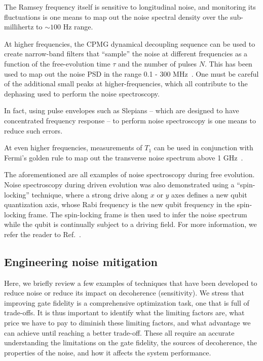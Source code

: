 \documentclass[aip,apr,twocolumn,showpacs,superscriptaddress,groupedaddress,nofootinbib,reprint]{revtex4-1}  %
\begin{document}
The Ramsey frequency itself is sensitive to longitudinal noise, and monitoring its fluctuations is one means to map out the noise spectral density over the sub-millihertz to $\sim100$ Hz range\cite{Yan2012,SankPhD2014}.

At higher frequencies, the CPMG dynamical decoupling sequence can be used to create narrow-band filters that ``sample'' the noise at different frequencies as a function of the free-evolution time $\tau$ and the number of pulses $N$. This has been used to map out the noise PSD in the range 0.1 - 300 MHz~\cite{Bylander2011}.
One must be careful of the additional small peaks at higher-frequencies, which all contribute to the dephasing used to perform the noise spectroscopy\cite{Loretz2015}.

In fact, using pulse envelopes such as Slepians\cite{Slepian1961} -- which are designed to have concentrated frequency response -- to perform noise spectroscopy is one means to reduce such errors\cite{Biercuk2009a}.

At even higher frequencies, measurements of $T_1$ can be used in conjunction with Fermi's golden rule to map out the transverse noise spectrum above 1 GHz~\cite{Bylander2011,Yan2016,Schoelkopf2002}.

The aforementioned are all examples of noise spectroscopy during free evolution. Noise spectroscopy during driven evolution was also demonstrated using a ``spin-locking'' technique, where a strong drive along $x$ or $y$ axes defines a new qubit quantization axis, whose Rabi frequency is the new qubit frequency in the spin-locking frame. The spin-locking frame is then used to infer the noise spectrum while the qubit is continually subject to a driving field. For more information, we refer the reader to Ref.~.

\subsection{Engineering noise mitigation}

Here, we briefly review a few examples of techniques that have been developed to reduce noise or reduce its impact on decoherence (sensitivity). We stress that improving gate fidelity is a comprehensive optimization task, one that is full of trade-offs. It is thus important to identify what the limiting factors are, what price we have to pay to diminish these limiting factors, and what advantage we can achieve until reaching a better trade-off. These all require an accurate understanding the limitations on the gate fidelity, the sources of decoherence, the properties of the noise, and how it affects the system performance.
\end{document}
